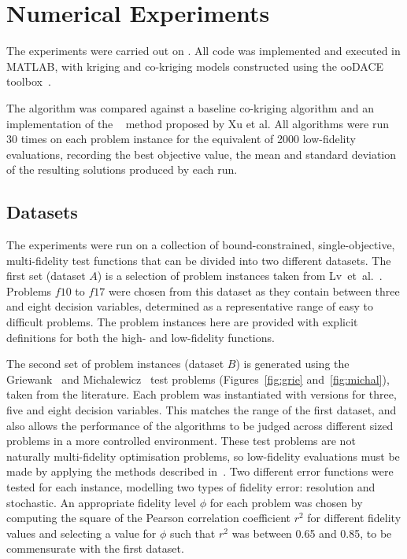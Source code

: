 \section{Numerical Experiments}\label{sec:exp}
The experiments were carried out on . All code was implemented and executed in MATLAB, with kriging and co-kriging models constructed using the ooDACE toolbox~\cite{oodace}.

The \AlgName{} algorithm was compared against a baseline co-kriging algorithm and an implementation of the \motos{}~\cite{xu2016mo2tos} method proposed by Xu et al. All algorithms were run 30 times on each problem instance for the equivalent of 2000 low-fidelity evaluations, recording the best objective value, the mean and standard deviation of the resulting solutions produced by each run.


\subsection{Datasets}
The experiments were run on a collection of bound-constrained, single-objective, multi-fidelity test functions that can be divided into two different datasets. The first set (dataset $A$) is a selection of problem instances taken from Lv~et~al.~\cite{lv2021multi}. Problems $f10$ to $f17$ were chosen from this dataset as they contain between three and eight decision variables, determined as a representative range of easy to difficult problems. The problem instances here are provided with explicit definitions for both the high- and low-fidelity functions.

The second set of problem instances (dataset $B$) is generated using the Griewank~\cite{griewank1981generalized} and Michalewicz~\cite{michalewicz2013genetic} test problems (Figures~\ref{fig:grie} and~\ref{fig:michal}), taken from the literature. Each problem was instantiated with versions for three, five and eight decision variables. This matches the range of the first dataset, and also allows the performance of the algorithms to be judged across different sized problems in a more controlled environment. These test problems are not naturally multi-fidelity optimisation problems, so low-fidelity evaluations must be made by applying the methods described in~\cite{wang2017generic}. Two different error functions were tested for each instance, modelling two types of fidelity error: resolution and stochastic. An appropriate fidelity level $\phi$ for each problem was chosen by computing the square of the Pearson correlation coefficient $r^2$ for different fidelity values and selecting a value for $\phi$ such that $r^2$ was between 0.65 and 0.85, to be commensurate with the first dataset.

